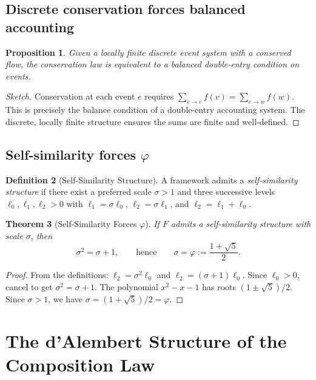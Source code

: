 \documentclass[11pt]{article}
\newtheorem{theorem}{Theorem}[section]
\newtheorem{proposition}[theorem]{Proposition}
\theoremstyle{definition}
\newtheorem{definition}[theorem]{Definition}
\theoremstyle{remark}
\begin{document}
\subsection{Discrete conservation forces balanced accounting}

\begin{proposition}\label{prop:ledger}
Given a locally finite discrete event system with a conserved flow,
the conservation law is equivalent to a balanced double-entry
condition on events.
\end{proposition}
\begin{proof}[Sketch]
Conservation at each event $e$ requires
$\sum_{v \to e} f(v) = \sum_{e \to w} f(w)$.
This is precisely the balance condition of a double-entry
accounting system.
The discrete, locally finite structure ensures the sums are
finite and well-defined.
\end{proof}

\subsection{Self-similarity forces $\varphi$}

\begin{definition}[Self-Similarity Structure]\label{def:self-sim}
A framework admits a \emph{self-similarity structure} if there
exist a preferred scale $\sigma > 1$ and three successive levels
$\ell_0, \ell_1, \ell_2 > 0$ with
$\ell_1 = \sigma \ell_0$,\;
$\ell_2 = \sigma \ell_1$,\; and
$\ell_2 = \ell_1 + \ell_0$.
\end{definition}

\begin{theorem}[Self-Similarity Forces $\varphi$]\label{thm:phi}
If $F$ admits a self-similarity structure with scale $\sigma$, then
\[
\sigma^2 = \sigma + 1,
\qquad\text{hence}\qquad
\sigma = \varphi := \frac{1 + \sqrt{5}}{2}.
\]
\end{theorem}
\begin{proof}
From the definitions:
$\ell_2 = \sigma^2 \ell_0$ and
$\ell_2 = (\sigma + 1)\ell_0$.
Since $\ell_0 > 0$, cancel to get $\sigma^2 = \sigma + 1$.
The polynomial $x^2 - x - 1$ has roots
$(1 \pm \sqrt{5})/2$.
Since $\sigma > 1$, we have $\sigma = (1 + \sqrt{5})/2 = \varphi$.
\end{proof}

\section{The d'Alembert Structure of the Composition Law}
\label{sec:dalembert}
\end{document}
